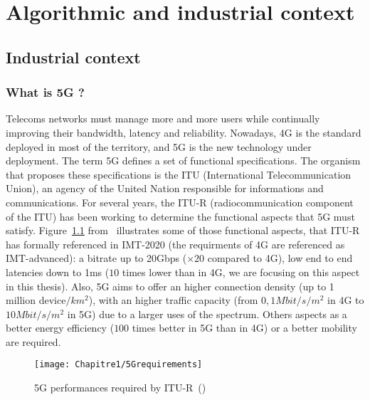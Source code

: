 
\chapter{Algorithmic and industrial context}
\label{chap:context}
\minitoc

\section{Industrial context}
\subsection{What is 5G ?}



Telecoms networks must manage more and more users while continually improving their bandwidth, latency and reliability. Nowadays, 4G is the standard deployed in most of the territory, and 5G is the new technology under deployment. The term 5G defines a set of functional specifications. The organism that proposes these specifications is the ITU (International Telecommunication Union), an agency of the United Nation responsible for informations and communications. For several years, the ITU-R (radiocommunication component of the ITU) has been working to determine the functional aspects that 5G must satisfy. Figure~\ref{fig:5gperf} from~\cite{dahlman20185g} illustrates some of those functional aspects, that ITU-R has formally referenced in IMT-2020 (the requirments of 4G are referenced as IMT-advanced): a bitrate up to 20Gbps ($\times 20$ compared to 4G), low end to end latencies down to 1ms ($10$ times lower than in 4G, we are focusing on this aspect in this thesis).
Also, 5G aims to offer an higher connection density (up to 1 million device$/km^2$), with an higher traffic capacity (from $0,1 Mbit/s/m^2$ in 4G to $10 Mbit/s/m^2$ in 5G) due to a larger uses of the spectrum. Others aspects as a better energy efficiency ($100$ times better in 5G than in 4G) or a better mobility are required. 

  \begin{figure}[h]
      \begin{center}
      \texttt{[image: Chapitre1/5Grequirements]}
      \end{center}
      \caption{5G performances required by ITU-R~(\cite{dahlman20185g})}\label{fig:5gperf}
      \end{figure}

